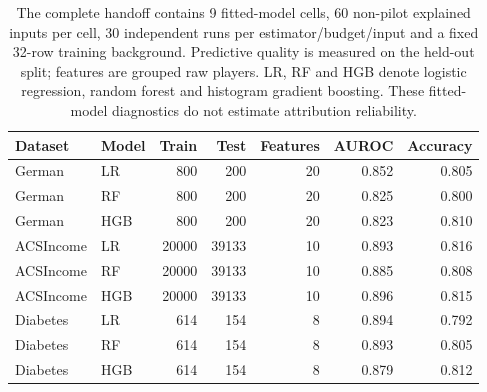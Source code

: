 \begin{table}[tb]
\centering
\caption{The complete handoff contains 9 fitted-model cells, 60 non-pilot explained inputs per cell, 30 independent runs per estimator/budget/input and a fixed 32-row training background. Predictive quality is measured on the held-out split; features are grouped raw players. LR, RF and HGB denote logistic regression, random forest and histogram gradient boosting. These fitted-model diagnostics do not estimate attribution reliability.}
\label{tab:study-coverage}
\small
\begin{tabular}{llrrrrr}
\toprule
Dataset & Model & Train & Test & Features & AUROC & Accuracy \\
\midrule
German & LR & 800 & 200 & 20 & 0.852 & 0.805 \\
German & RF & 800 & 200 & 20 & 0.825 & 0.800 \\
German & HGB & 800 & 200 & 20 & 0.823 & 0.810 \\
ACSIncome & LR & 20000 & 39133 & 10 & 0.893 & 0.816 \\
ACSIncome & RF & 20000 & 39133 & 10 & 0.885 & 0.808 \\
ACSIncome & HGB & 20000 & 39133 & 10 & 0.896 & 0.815 \\
Diabetes & LR & 614 & 154 & 8 & 0.894 & 0.792 \\
Diabetes & RF & 614 & 154 & 8 & 0.893 & 0.805 \\
Diabetes & HGB & 614 & 154 & 8 & 0.879 & 0.812 \\
\bottomrule
\end{tabular}
\end{table}
